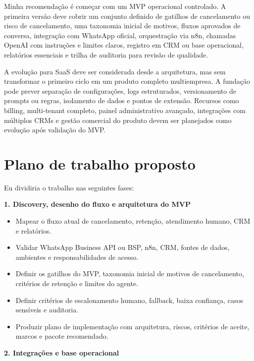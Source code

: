 \documentclass[11pt,a4paper]{article}
\begin{document}
Minha recomendação é começar com um MVP operacional controlado. A primeira versão deve cobrir um conjunto definido de gatilhos de cancelamento ou risco de cancelamento, uma taxonomia inicial de motivos, fluxos aprovados de conversa, integração com WhatsApp oficial, orquestração via n8n, chamadas OpenAI com instruções e limites claros, registro em CRM ou base operacional, relatórios essenciais e trilha de auditoria para revisão de qualidade.\par

A evolução para SaaS deve ser considerada desde a arquitetura, mas sem transformar o primeiro ciclo em um produto completo multiempresa. A fundação pode prever separação de configurações, logs estruturados, versionamento de prompts ou regras, isolamento de dados e pontos de extensão. Recursos como billing, multi-tenant completo, painel administrativo avançado, integrações com múltiplos CRMs e gestão comercial do produto devem ser planejados como evolução após validação do MVP.\par

\section*{Plano de trabalho proposto}

Eu dividiria o trabalho nas seguintes fases:\par

\textbf{1. Discovery, desenho do fluxo e arquitetura do MVP}\par

\begin{itemize}
\item Mapear o fluxo atual de cancelamento, retenção, atendimento humano, CRM e relatórios.
\item Validar WhatsApp Business API ou BSP, n8n, CRM, fontes de dados, ambientes e responsabilidades de acesso.
\item Definir os gatilhos do MVP, taxonomia inicial de motivos de cancelamento, critérios de retenção e limites do agente.
\item Definir critérios de escalonamento humano, fallback, baixa confiança, casos sensíveis e auditoria.
\item Produzir plano de implementação com arquitetura, riscos, critérios de aceite, marcos e pacote recomendado.
\end{itemize}

\textbf{2. Integrações e base operacional}\par
\end{document}
